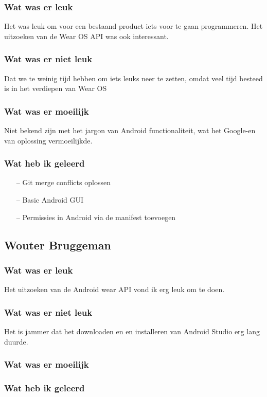 \documentclass[../main.tex]{subfiles}
\begin{document}
\subsubsection{Wat was er leuk}
Het was leuk om voor een bestaand product iets voor te gaan programmeren. Het uitzoeken van de
Wear OS API was ook interessant.
\subsubsection{Wat was er niet leuk}
Dat we te weinig tijd hebben om iets leuks neer te zetten, omdat veel tijd besteed is in het verdiepen
van Wear OS
\subsubsection{Wat was er moeilijk}
Niet bekend zijn met het jargon van Android functionaliteit, wat het Google-en van oplossing
vermoeilijkde.
\subsubsection{Wat heb ik geleerd}
\begin{itemize}
	\item[--] Git merge conflicts oplossen
	\item[--] Basic Android GUI
	\item[--] Permissies in Android via de manifest toevoegen
\end{itemize}
\newpage

\subsection{Wouter Bruggeman}
\subsubsection{Wat was er leuk}
Het uitzoeken van de Android wear API vond ik erg leuk om te doen.
\subsubsection{Wat was er niet leuk}
Het is jammer dat het downloaden en en installeren van Android Studio erg lang duurde.
\subsubsection{Wat was er moeilijk}
\subsubsection{Wat heb ik geleerd}
\newpage
\end{document}
